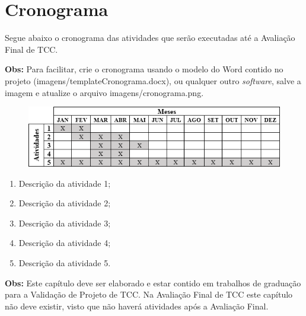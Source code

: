 \chapter{Cronograma}
\label{cap:06}

Segue abaixo o cronograma das atividades que serão executadas até a Avaliação Final de TCC.

\textbf{Obs:} Para facilitar, crie o cronograma usando o modelo do Word contido no projeto (imagens/templateCronograma.docx), ou qualquer outro \textit{software}, salve a imagem e atualize o arquivo imagens/cronograma.png.

\FloatBarrier
\begin{figure}[!htbp]
	\centering
	\includegraphics[scale=1]{imagens/cronograma}
\end{figure}
\FloatBarrier

\begin{enumerate}
	\item Descrição da atividade 1;
	\item Descrição da atividade 2;
	\item Descrição da atividade 3;
	\item Descrição da atividade 4;
	\item Descrição da atividade 5.
\end{enumerate}

\textbf{Obs:} Este capítulo deve ser elaborado e estar contido em trabalhos de graduação para a Validação de Projeto de TCC. Na Avaliação Final de TCC este capítulo não deve existir, visto que não haverá atividades após a Avaliação Final.